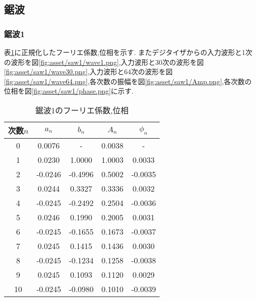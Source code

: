 \subsection{鋸波}
\subsubsection{鋸波1}
表\ref{tab:saw1_res}に正規化したフーリエ係数,位相を示す.
またデジタイザからの入力波形と1次の波形を図\ref{fig:asset/saw1/wave1.png},入力波形と30次の波形を図\ref{fig:asset/saw1/wave30.png},入力波形と64次の波形を図\ref{fig:asset/saw1/wave64.png},各次数の振幅を図\ref{fig:asset/saw1/Amp.png},各次数の位相を図\ref{fig:asset/saw1/phase.png}に示す.
\begin{table}[h]
   \caption{鋸波1のフーリエ係数,位相}
   \label{tab:saw1_res}
   \centering
   \begin{tabular}{ccccc}
     \hline
     次数$n$&$a_n$&$b_n$&$A_n$&$\phi_n$\\
     \hline \hline
     0 & 0.0076 & - & 0.0038 & - \\
1 & 0.0230 & 1.0000 & 1.0003 & 0.0033 \\
2 & -0.0246 & -0.4996 & 0.5002 & -0.0035 \\
3 & 0.0244 & 0.3327 & 0.3336 & 0.0032 \\
4 & -0.0245 & -0.2492 & 0.2504 & -0.0036 \\
5 & 0.0246 & 0.1990 & 0.2005 & 0.0031 \\
6 & -0.0245 & -0.1655 & 0.1673 & -0.0037 \\
7 & 0.0245 & 0.1415 & 0.1436 & 0.0030 \\
8 & -0.0245 & -0.1234 & 0.1258 & -0.0038 \\
9 & 0.0245 & 0.1093 & 0.1120 & 0.0029 \\
10 & -0.0245 & -0.0980 & 0.1010 & -0.0039 \\
     \hline
   \end{tabular}
\end{table}

\begin{figure}[htbp]
  \begin{minipage}{0.5\hsize}
  \end{minipage}
  \begin{minipage}{0.5\hsize}
  \end{minipage} 
\end{figure}

\begin{figure}[htbp]
  \begin{minipage}{0.5\hsize}
  \end{minipage}
  \begin{minipage}{0.5\hsize}
  \end{minipage} 
\end{figure}
